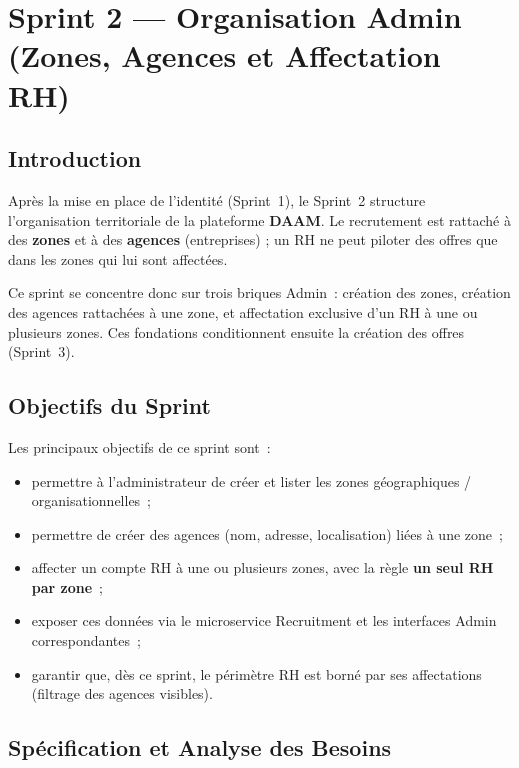\chapter{Sprint 2 --- Organisation Admin (Zones, Agences et Affectation RH)}

\section{Introduction}

Après la mise en place de l'identité (Sprint~1), le Sprint~2 structure
l'organisation territoriale de la plateforme \textbf{DAAM}. Le recrutement
est rattaché à des \textbf{zones} et à des \textbf{agences} (entreprises) ;
un RH ne peut piloter des offres que dans les zones qui lui sont affectées.

Ce sprint se concentre donc sur trois briques Admin~: création des zones,
création des agences rattachées à une zone, et affectation exclusive d'un
RH à une ou plusieurs zones. Ces fondations conditionnent ensuite la
création des offres (Sprint~3).


\section{Objectifs du Sprint}

Les principaux objectifs de ce sprint sont~:
\begin{itemize}
  \item permettre à l'administrateur de créer et lister les zones
        géographiques / organisationnelles~;
  \item permettre de créer des agences (nom, adresse, localisation) liées
        à une zone~;
  \item affecter un compte RH à une ou plusieurs zones, avec la règle
        \textbf{un seul RH par zone}~;
  \item exposer ces données via le microservice Recruitment et les
        interfaces Admin correspondantes~;
  \item garantir que, dès ce sprint, le périmètre RH est borné par ses
        affectations (filtrage des agences visibles).
\end{itemize}


\section{Spécification et Analyse des Besoins}

